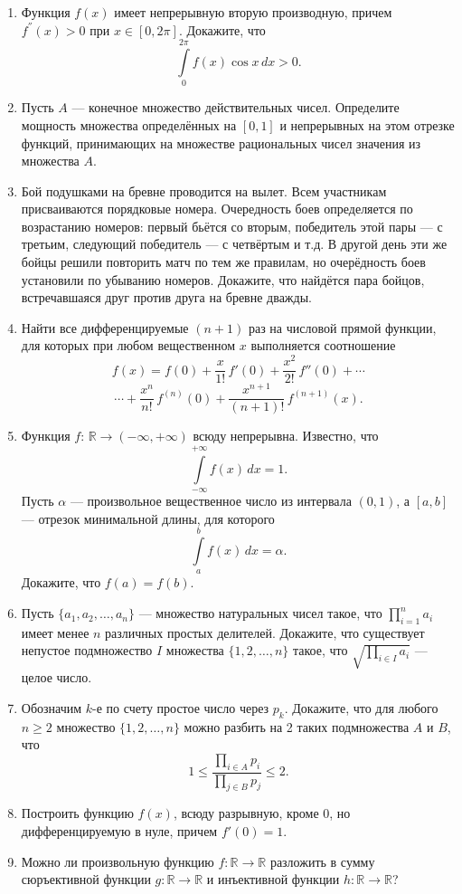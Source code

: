 \begin{enumerate}
\item Функция $f(x)$ имеет непрерывную вторую производную, причем $f^{''}(x)>0$ при $x \in [0, 2\pi]$. Докажите, что  
$$ \int\limits_0^{2\pi} f(x)\cos x\,dx > 0. $$

\item Пусть $A$ --- конечное множество действительных чисел. Определите мощность множества определённых на $[0,1]$ и непрерывных на этом отрезке функций, принимающих на множестве рациональных чисел значения из множества $A$.

\item Бой подушками на бревне проводится на вылет. Всем участникам присваиваются порядковые номера. Очередность боев определяется по возрастанию номеров: первый бьётся со вторым, победитель этой пары --- с третьим, следующий победитель --- с четвёртым и т.д. В другой день эти же бойцы решили повторить матч по тем же правилам, но очерёдность боев установили по убыванию номеров. Докажите, что найдётся пара бойцов, встречавшаяся друг против друга на бревне дважды.

\item Найти все дифференцируемые $(n+1)$ раз на числовой прямой функции, для которых при любом вещественном $x$ выполняется соотношение
$$
f(x)=f(0)+\frac{x}{1!}\,f'(0)+\frac{x^2}{2!}\,f''(0)+\cdots$$
$$\cdots + \frac{x^n}{n!}\,f^{(n)}(0)+\frac{x^{n+1}}{(n+1)!}\,f^{(n+1)}(x).
$$

\item Функция $f$: $\mathbb{R} \rightarrow (-\infty, +\infty)$ всюду непрерывна. Известно, что
$$ \int\limits_{-\infty}^{+\infty} f(x)\,dx = 1. $$
Пусть $\alpha$ --- произвольное вещественное число из интервала $(0, 1)$, а $[a, b]$ --- отрезок минимальной длины, для которого
$$\int\limits_{a}^{b} f(x)\,dx = \alpha.$$ Докажите, что $f(a) = f(b)$.

\item Пусть $\{a_1, a_2, \hdots, a_n\}$ --- множество натуральных чисел такое, что $\prod\limits_{i=1}^n a_i$ имеет менее $n$ различных простых делителей. Докажите, что существует непустое подмножество $I$ множества $\{1, 2, \hdots, n\}$ такое, что $\sqrt{\prod\limits_{i \in I} a_i}$ --- целое число.

\item Обозначим $k$-е по счету простое число через $p_k$. Докажите, что для любого $n \geqslant 2$ множество $\{1, 2, \hdots, n\}$ можно разбить на 2 таких подмножества $A$ и $B$, что
$$1 \leqslant \frac{ \prod\limits_{i \in A}{p_i} }{ \prod\limits_{j \in B}{p_j} } \leqslant 2.$$

\item Построить функцию $f(x)$, всюду разрывную, кроме $0$, но дифференцируемую в нуле, причем $f'(0)=1$.

\item Можно ли произвольную функцию $f: \mathbb{R} \rightarrow \mathbb{R}$ разложить в сумму сюръективной функции $g: \mathbb{R} \rightarrow \mathbb{R}$ и инъективной функции $h: \mathbb{R} \rightarrow \mathbb{R}$?

\end{enumerate}